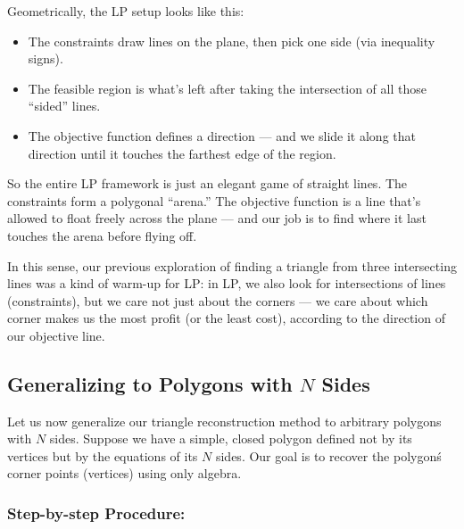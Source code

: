 \documentclass[10pt,twocolumn]{article}
\begin{document}
\medskip

Geometrically, the LP setup looks like this:

\begin{itemize}
    \item The constraints draw lines on the plane, then pick one side (via inequality signs).
    \item The feasible region is what’s left after taking the intersection of all those “sided” lines.
    \item The objective function defines a direction — and we slide it along that direction until it touches the farthest edge of the region.
\end{itemize}

\medskip

So the entire LP framework is just an elegant game of straight lines. The constraints form a polygonal “arena.” The objective function is a line that’s allowed to float freely across the plane — and our job is to find where it last touches the arena before flying off.

\medskip

In this sense, our previous exploration of finding a triangle from three intersecting lines was a kind of warm-up for LP: in LP, we also look for intersections of lines (constraints), but we care not just about the corners — we care about which corner makes us the most profit (or the least cost), according to the direction of our objective line.

\subsection{Generalizing to Polygons with \(N\) Sides}

Let us now generalize our triangle reconstruction method to arbitrary polygons with \(N\) sides. Suppose we have a simple, closed polygon defined not by its vertices but by the equations of its \(N\) sides. Our goal is to recover the polygon\'s corner points (vertices) using only algebra.

\subsubsection*{Step-by-step Procedure:}
\end{document}
